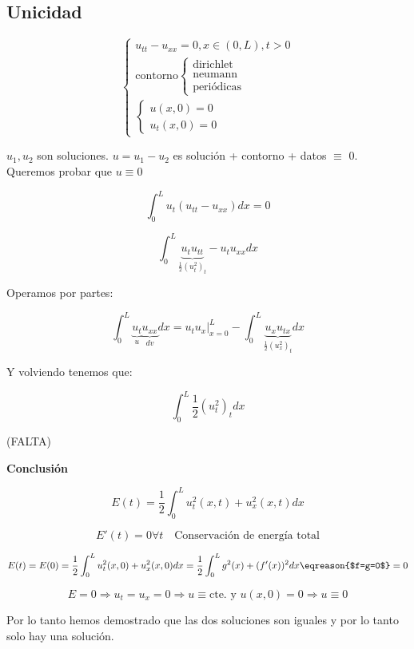 	\subsection{Unicidad}

		\[\begin{cases}
		   u_{tt}-u_{xx} = 0, x \in (0,L), t >0\\
		   \text{contorno} \begin{cases}
		   	\text{dirichlet}\\
		   	\text{neumann}\\
		   	\text{periódicas}
		   \end{cases}\\
		   \begin{cases}
		   u(x,0) = 0 \\
		   u_t (x,0) = 0
		   \end{cases}
		\end{cases}
		 \]


		 $u_1, u_{2}$ son soluciones. $u = u_1 - u_2$ es solución + contorno + datos $\equiv$ 0. Queremos probar que $u\equiv0$


		 \[ \int_{0}^{L} u_t (u_{tt}- u_{xx}) dx = 0 \]

		 \[ \int_0^L \underbrace{u_t u_{tt}}_{\frac{1}{2}(u^2_t)_t} - u_t u_{xx} dx  \]

		 Operamos por partes:

		 \[ \int_0^L  \underbrace{u_t}_{u} \underbrace{u_{xx}}_{dv}  dx = \left. u_t u_x \right|_{x=0}^{L} - \int_0^L \underbrace{u_x u_{tx}}_{\frac{1}{2}(u_x^2)_t} dx \]

		 Y volviendo tenemos que:

		 \[  \int^{L}_{0} \frac{1}{2} (u_t^2)_t dx  \]

		 (FALTA)


		 \textbf{Conclusión}

		 \[ E(t) = \frac{1}{2} \int_{0}^L u_t^2(x,t) + u_x^2(x,t) dx \]

		 \[ E'(t) = 0 \forall t \quad \text{Conservación de energía total}\]


		 \[ E(t) = E(0) = \frac{1}{2} \int_0^L u_t^2 (x,0) + u_x^2 (x,0) dx = \frac{1}{2} \int_0^L g^2(x)+(f'(x))^2 dx \eqreason{$f=g=0$} = 0 \]

		 \[ E=0 \Rightarrow u_t = u_x = 0 \Rightarrow u \equiv \text{cte. y } u(x,0) = 0 \Rightarrow u \equiv 0\]

		 Por lo tanto hemos demostrado que las dos soluciones son iguales y por lo tanto solo hay una solución.

